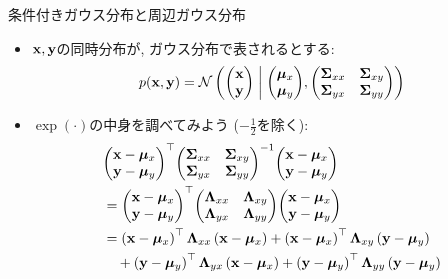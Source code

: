 \documentclass[dvipdfmx,notheorems,t]{beamer}
\begin{document}
\begin{frame}{条件付きガウス分布と周辺ガウス分布}
\begin{itemize}
  \item $\vb{x}, \vb{y}$の同時分布が, ガウス分布で表されるとする:
  \begin{align*}
    p(\vb{x}, \vb{y}) = \mathcal{N} \left( \mqty(\vb{x} \\ \vb{y}) \middlerel|
      \mqty(\vb*{\mu}_x \\ \vb*{\mu}_y),
      \mqty(\vb{\Sigma}_{xx} & \vb{\Sigma}_{xy} \\
        \vb{\Sigma}_{yx} & \vb{\Sigma}_{yy}) \right)
  \end{align*}
  \item $\exp(\cdot)$の中身を調べてみよう ($-\frac{1}{2}$を除く):
  \begin{align*}
    & \mqty(\vb{x} - \vb*{\mu}_x \\ \vb{y} - \vb*{\mu}_y)^\top
      \mqty(\vb{\Sigma}_{xx} & \vb{\Sigma}_{xy} \\
        \vb{\Sigma}_{yx} & \vb{\Sigma}_{yy})^{-1}
      \mqty(\vb{x} - \vb*{\mu}_x \\ \vb{y} - \vb*{\mu}_y) \\
    &= \mqty(\vb{x} - \vb*{\mu}_x \\ \vb{y} - \vb*{\mu}_y)^\top
      \mqty(\vb{\Lambda}_{xx} & \vb{\Lambda}_{xy} \\
        \vb{\Lambda}_{yx} & \vb{\Lambda}_{yy})
      \mqty(\vb{x} - \vb*{\mu}_x \\ \vb{y} - \vb*{\mu}_y) \\
    &= \left( \vb{x} - \vb*{\mu}_x \right)^\top \vb{\Lambda}_{xx}
      \left( \vb{x} - \vb*{\mu}_x \right)
      + \left( \vb{x} - \vb*{\mu}_x \right)^\top \vb{\Lambda}_{xy}
      \left( \vb{y} - \vb*{\mu}_y \right) \\
    & \quad + \left( \vb{y} - \vb*{\mu}_y \right)^\top \vb{\Lambda}_{yx}
      \left( \vb{x} - \vb*{\mu}_x \right)
      + \left( \vb{y} - \vb*{\mu}_y \right)^\top \vb{\Lambda}_{yy}
      \left( \vb{y} - \vb*{\mu}_y \right)
  \end{align*}
\end{itemize}
\end{frame}
\end{document}
